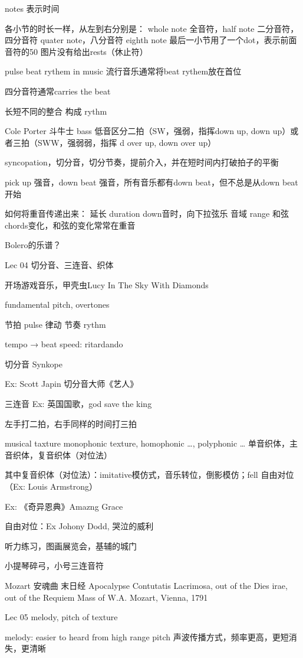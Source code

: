 notes 表示时间

各小节的时长一样，从左到右分别是：
whole note 全音符，half note 二分音符，四分音符 quater note，八分音符 eighth note
最后一小节用了一个dot，表示前面音符的50%
图片没有给出rests（休止符）

pulse beat rythem in music 
流行音乐通常将beat rythem放在首位

四分音符通常carries the beat

长短不同的整合 构成 rythm

Cole Porter 斗牛士 bass 低音区分二拍（SW，强弱，指挥down up, down up）或者三拍（SWW，强弱弱，指挥 d over up, down over up）

syncopation，切分音，切分节奏，提前介入，并在短时间内打破拍子的平衡

pick up 强音，down beat 强音，所有音乐都有down beat，但不总是从down beat开始

如何将重音传递出来：
延长 duration
down音时，向下拉弦乐
音域 range
和弦 chords变化，和弦的变化常常在重音

Bolero的乐谱？


Lec 04 切分音、三连音、织体


开场游戏音乐，甲壳虫Lucy In The Sky With Diamonds

fundamental pitch, overtones

节拍 pulse 律动
节奏 rythm

tempo → beat speed: ritardando

切分音 Synkope


Ex: Scott Japin 切分音大师《艺人》

三连音
Ex: 英国国歌，god save the king


左手打二拍，右手同样的时间打三拍

musical taxture
monophonic texture, homophonic …, polyphonic …
单音织体，主音织体，复音织体（对位法）

其中复音织体（对位法）：imitative模仿式，音乐转位，倒影模仿；fell 自由对位（Ex: Louis Armstrong） 

Ex: 《奇异恩典》Amazng Grace

自由对位：Ex Johony Dodd, 哭泣的威利

听力练习，图画展览会，基辅的城门

小提琴碎弓，小号三连音符

Mozart 安魂曲 末日经 Apocalypse Contutatis
Lacrimosa, out of the Dies irae, out of the Requiem Mass of W.A. Mozart, Vienna, 1791


Lec 05 melody, pitch of texture

melody: easier to heard from high range pitch 声波传播方式，频率更高，更短消失，更清晰

